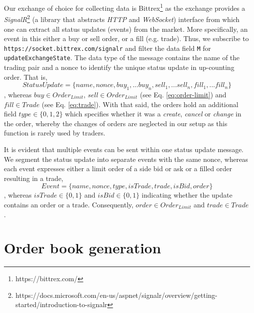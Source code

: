 Our exchange of choice for collecting data is Bittrex\footnote{https://bittrex.com/} as the exchange provides a \textit{SignalR}\footnote{https://docs.microsoft.com/en-us/aspnet/signalr/overview/getting-started/introduction-to-signalr} (a library that abstracts \textit{HTTP} and \textit{WebSocket}) interface from which one can extract all status updates (events) from the market.
More specifically, an event in this either a buy or sell order, or a fill (e.g. trade).
Thus, we subscribe to \texttt{https://socket.bittrex.com/signalr} and filter the data field \texttt{M} for \texttt{updateExchangeState}.
The data type of the message contains the name of the trading pair and a nonce to identify the unique status update in up-counting order.
That is,
\begin{equation}
    StatusUpdate = \{name, nonce, buy_1,...buy_n, sell_1,...sell_n, fill_1,...fill_n\}
\end{equation}
, whereas $buy \in Order_{Limit}$, $sell \in Order_{Limit}$ (see Eq. \ref{eq:order-limit}) and $fill \in Trade$ (see Eq. \ref{eq:trade}).
With that said, the orders hold an additional field $type \in \{0,1,2\}$ which specifies whether it was a \textit{create}, \textit{cancel} or \textit{change} in the order, whereby the changes of orders are neglected in our setup as this function is rarely used by traders.

It is evident that multiple events can be sent within one status update message. 
We segment the status update into separate events with the same nonce, whereas each event expresses either a limit order of a side bid or ask or a filled order resulting in a trade,
\begin{equation}\label{eq:event-update}
    Event = \{name, nonce, type, isTrade, trade, isBid, order\}
\end{equation}
, whereas $isTrade \in \{0,1\}$ and $isBid \in \{0,1\}$ indicating whether the update contains an order or a trade. 
Consequently, $order \in Order_{Limit}$ and $trade \in Trade$.

\section{Order book generation}
\label{sec:data-generation}

